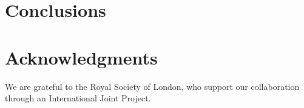 \documentclass{llncs}
\begin{document}

\section{Conclusions}
\label{section:conclusions}




\section*{Acknowledgments}

We are grateful to the Royal Society of London, who support our collaboration
through an International Joint Project.








\end{document}
